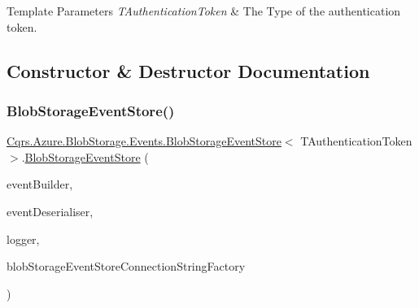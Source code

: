 \begin{DoxyTemplParams}{Template Parameters}
{\em T\+Authentication\+Token} & The Type of the authentication token.\\
\hline
\end{DoxyTemplParams}


\subsection{Constructor \& Destructor Documentation}
\mbox{\label{classCqrs_1_1Azure_1_1BlobStorage_1_1Events_1_1BlobStorageEventStore_a04ce4516e7e1d30339d3f04ba54abe54_a04ce4516e7e1d30339d3f04ba54abe54}} 
\subsubsection{\texorpdfstring{Blob\+Storage\+Event\+Store()}{BlobStorageEventStore()}}
{\footnotesize\ttfamily \hyperlink{classCqrs_1_1Azure_1_1BlobStorage_1_1Events_1_1BlobStorageEventStore}{Cqrs.\+Azure.\+Blob\+Storage.\+Events.\+Blob\+Storage\+Event\+Store}$<$ T\+Authentication\+Token $>$.\hyperlink{classCqrs_1_1Azure_1_1BlobStorage_1_1Events_1_1BlobStorageEventStore}{Blob\+Storage\+Event\+Store} (\begin{DoxyParamCaption}\item[{\hyperlink{interfaceCqrs_1_1Events_1_1IEventBuilder}{I\+Event\+Builder}$<$ T\+Authentication\+Token $>$}]{event\+Builder,  }\item[{\hyperlink{interfaceCqrs_1_1Events_1_1IEventDeserialiser}{I\+Event\+Deserialiser}$<$ T\+Authentication\+Token $>$}]{event\+Deserialiser,  }\item[{I\+Logger}]{logger,  }\item[{\hyperlink{interfaceCqrs_1_1Azure_1_1BlobStorage_1_1IBlobStorageStoreConnectionStringFactory}{I\+Blob\+Storage\+Store\+Connection\+String\+Factory}}]{blob\+Storage\+Event\+Store\+Connection\+String\+Factory }\end{DoxyParamCaption})}



